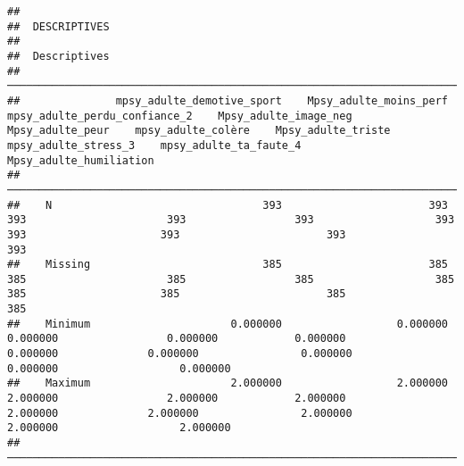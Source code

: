\documentclass[
]{article}
\begin{document}
\begin{verbatim}
## 
##  DESCRIPTIVES
## 
##  Descriptives                                                                                                                                                                                                                                                               
##  ────────────────────────────────────────────────────────────────────────────────────────────────────────────────────────────────────────────────────────────────────────────────────────────────────────────────────────────────────────────────────────────────────────── 
##               mpsy_adulte_demotive_sport    Mpsy_adulte_moins_perf    mpsy_adulte_perdu_confiance_2    Mpsy_adulte_image_neg    Mpsy_adulte_peur    mpsy_adulte_colère    Mpsy_adulte_triste    mpsy_adulte_stress_3    mpsy_adulte_ta_faute_4    Mpsy_adulte_humiliation   
##  ────────────────────────────────────────────────────────────────────────────────────────────────────────────────────────────────────────────────────────────────────────────────────────────────────────────────────────────────────────────────────────────────────────── 
##    N                                 393                       393                              393                      393                 393                   393                   393                     393                       393                        393   
##    Missing                           385                       385                              385                      385                 385                   385                   385                     385                       385                        385   
##    Minimum                      0.000000                  0.000000                         0.000000                 0.000000            0.000000              0.000000              0.000000                0.000000                  0.000000                   0.000000   
##    Maximum                      2.000000                  2.000000                         2.000000                 2.000000            2.000000              2.000000              2.000000                2.000000                  2.000000                   2.000000   
##  ──────────────────────────────────────────────────────────────────────────────────────────────────────────────────────────────────────────────────────────────────────────────────────────────────────────────────────────────────────────────────────────────────────────
\end{verbatim}
\end{document}
